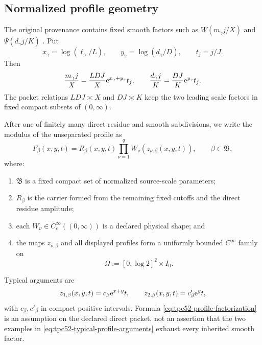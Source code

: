 \subsection{Normalized profile geometry}

The original provenance contains fixed smooth factors such as
\(W(m_\gamma j/X)\) and \(\Psi(d_\gamma j/K)\)
\citep{WangTPC25}.  Put
\begin{equation}
 x_\gamma=\log(\ell_\gamma/L),
 \qquad y_\gamma=\log(d_\gamma/D),
 \qquad t_j=j/J.
 \label{eq:tpc52-log-coordinates}
\end{equation}
Then
\begin{equation}
 \frac{m_\gamma j}{X}
 =\frac{LDJ}{X}\mathrm e^{x_\gamma+y_\gamma}t_j,
 \qquad
 \frac{d_\gamma j}{K}
 =\frac{DJ}{K}\mathrm e^{y_\gamma}t_j.
 \label{eq:tpc52-scaled-arguments}
\end{equation}
The packet relations \(LDJ\asymp X\) and \(DJ\asymp K\) keep the two
leading scale factors in fixed compact subsets of \((0,\infty)\).

After one of finitely many direct residue and smooth subdivisions, we
write the modulus of the unseparated profile as
\begin{equation}
 F_\beta(x,y,t)
 =R_\beta(x,y,t)
  \prod_{\nu=1}^q
  W_\nu(z_{\nu,\beta}(x,y,t)),
 \qquad \beta\in\mathfrak B,
 \label{eq:tpc52-profile-factorization}
\end{equation}
where:
\begin{enumerate}[label=\textup{(\alph*)},leftmargin=2.5em]
 \item \(\mathfrak B\) is a fixed compact set of normalized source-scale
 parameters;
 \item \(R_\beta\) is the carrier formed from the remaining fixed
 cutoffs and the direct residue amplitude;
 \item each \(W_\nu\in C_c^\infty((0,\infty))\) is a declared physical
 shape; and
 \item the maps \(z_{\nu,\beta}\) and all displayed profiles form a
 uniformly bounded \(C^\infty\) family on
 \begin{equation}
  \Omega:=[0,\log2]^2\times I_0.
  \label{eq:tpc52-profile-domain}
 \end{equation}
\end{enumerate}
Typical arguments are
\begin{equation}
 z_{1,\beta}(x,y,t)=c_\beta\mathrm e^{x+y}t,
 \qquad
 z_{2,\beta}(x,y,t)=c'_\beta\mathrm e^yt,
 \label{eq:tpc52-typical-profile-arguments}
\end{equation}
with \(c_\beta,c'_\beta\) in compact positive intervals.  Formula
\eqref{eq:tpc52-profile-factorization} is an assumption on the declared
direct packet, not an assertion that the two examples in
\eqref{eq:tpc52-typical-profile-arguments} exhaust every inherited
smooth factor.


